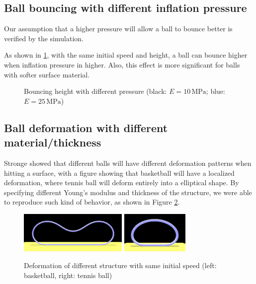 \documentclass[letterpaper,9pt,twocolumn]{extarticle}
\begin{document}
	\subsection{Ball bouncing with different inflation pressure}
		Our assumption that a higher pressure will allow a ball to bounce better is verified by the simulation.
	
		As shown in \ref{bh}, with the same initial speed and height, a ball can bounce higher when inflation pressure in higher. Also, this effect is more significant for balls with softer surface material.
		\begin{figure}[ht]
			\centering
			\caption{Bouncing height with different pressure (black: $E = 10\,\mathrm{MPa}$; blue: $E = 25\,\mathrm{MPa}$)}
			\label{bh}
		\end{figure}
	\subsection{Ball deformation with different material/thickness}
		Stronge \cite{Stronge06} showed that different balls will have different deformation patterns when hitting a surface, with a figure showing that basketball will have a localized deformation, where tennis ball will deform entirely into a elliptical shape. By specifying different Young's modulus and thickness of the structure, we were able to reproduce such kind of behavior, as shown in Figure \ref{balls}.
		\begin{figure}[ht]
			\centering
			\includegraphics[height=2cm]{res/basket.png}
			\includegraphics[height=2cm]{res/tennis.png}\\
			\caption{Deformation of different structure with same initial speed (left: basketball, right: tennis ball)}
			\label{balls}
		\end{figure}
\end{document}
